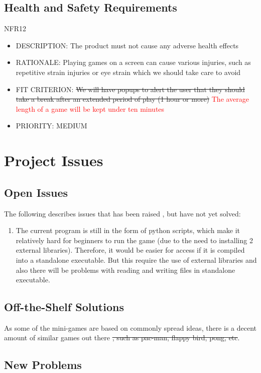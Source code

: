 \documentclass[12pt, titlepage]{article}
\begin{document}
\subsection{Health and Safety Requirements}
NFR12
\begin{itemize}
    \item DESCRIPTION: The product must not cause any adverse health effects
    \item RATIONALE: Playing games on a screen can cause various injuries, such as repetitive strain injuries
or eye strain which we should take care to avoid
    \item FIT CRITERION: \sout{We will have popups to alert the user that they should take a 
break after an extended period of play (1 hour or more)} \textcolor{red}{The average length of a game will be kept under ten minutes}
    \item PRIORITY: MEDIUM
\end{itemize}

\section{Project Issues}

\subsection{Open Issues}

The following describes issues that has been raised , but have not yet solved:
\begin{enumerate}
    \item The current program is still in the form of python scripts, which make it relatively hard for beginners to run the game (due to the need to installing 2 external libraries). Therefore, it would be easier for access if it is compiled into a standalone executable. But this require the use of external libraries and also there will be problems with reading and writing files in standalone executable.
\end{enumerate}

\subsection{Off-the-Shelf Solutions}

As some of the mini-games are based on commonly spread ideas, there is a decent amount of similar games out there \sout{, such as pac-man, flappy bird, pong, etc}.

\subsection{New Problems}
\end{document}
